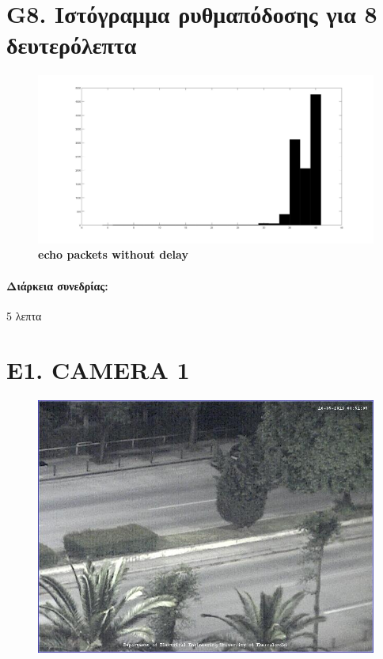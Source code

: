 \documentclass{article}
\begin{document}
\section*{G8. Ιστόγραμμα ρυθμαπόδοσης για 8 δευτερόλεπτα}

\begin{figure}[h!]
 \begin{center}
 \advance\leftskip-6.8cm
  \includegraphics[width=250mm,scale=0.7]{g8s1.jpg}
    \caption*{\textbf{echo packets without delay}}
  
\end{center}
\end{figure}
\paragraph{Διάρκεια συνεδρίας:} 5 λεπτα
\newpage
\large{}

\section*{E1. CAMERA 1}

\begin{figure}[h!]
 \begin{center}
 \advance\leftskip-4cm
  \includegraphics[width=200mm,scale=0.7]{pic1s1.jpeg}
   
  
\end{center}
\end{figure}
\newpage
\large{}
\end{document}
